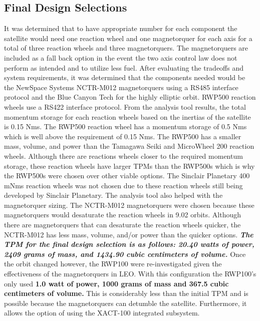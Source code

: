 \documentclass[conf]{new-aiaa}
\begin{document}
\subsection{Final Design Selections}
It was determined that to have appropriate number for each component the satellite would need one reaction wheel and one magnetorquer for each axis for a total of three reaction wheels and three magnetorquers. The magnetorquers are included as a fall back option in the event the two axis control law does not perform as intended and to utilize less fuel. After evaluating the tradeoffs and system requirements, it was determined that the components needed would be the NewSpace Systems NCTR-M012 \cite{M012} magnetorquers using a RS485 interface protocol and the Blue Canyon Tech for the highly elliptic orbit. RWP500 \cite{RWP500} reaction wheels use a RS422 interface protocol. From the analysis tool results, the total momentum storage for each reaction wheels based on the inertias of the satellite is 0.15 Nms. The RWP500 reaction wheel has a momentum storage of 0.5 Nms which is well above the requirement of 0.15 Nms. The RWP500 has a smaller mass, volume, and power than the Tamagawa Seiki \cite{Tamagawa-RW} and MicroWheel 200 \cite{MSCI} reaction wheels. Although there are reactions wheels closer to the required momentum storage, these reaction wheels have larger TPMs than the RWP500s which is why the RWP500s were chosen over other viable options. The Sinclair Planetary 400 mNms \cite{Sinclair-Light} reaction wheels was not chosen due to these reaction wheels still being developed by Sinclair Planetary. The analysis tool also helped with the magnetorquer sizing. The NCTR-M012 magnetorquers were chosen because these magnetorquers would desaturate the reaction wheels in 9.02 orbits. Although there are magnetorquers that can desaturate the reaction wheels quicker, the NCTR-M012 has less mass, volume, and/or power than the quicker options. \textbf{\textit{The TPM for the final design selection is as follows: 20.40 watts of power, 2409 grams of mass, and 1434.90 cubic centimeters of volume.}} Once the orbit changed however, the RWP100 were re-investigated given the effectiveness of the magnetorquers in LEO. With this configuration the RWP100's only used {\bf 1.0 watt of power, 1000 grams of mass and 367.5 cubic centimeters of volume.} This is considerably less than the initial TPM and is possible because the magnetorquers can detumble the satellite. Furthermore, it allows the option of using the XACT-100 integrated subsystem. 

\end{document}
